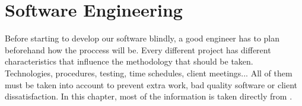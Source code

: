 \chapter{Software Engineering}

Before starting to develop our software blindly, a good engineer has to plan
beforehand how the proccess will be. Every different project has different
characteristics that influence the methodology that should be taken.
Technologies, procedures, testing, time schedules, client meetings... All of
them must be taken into account to prevent extra work, bad quality software or
client dissatisfaction. In this chapter, most of the information is taken
directly from \citet{Sommerville}.








